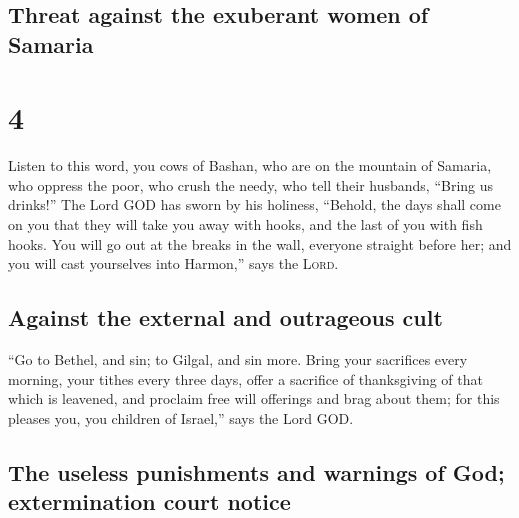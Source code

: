 \hypertarget{threat-against-the-exuberant-women-of-samaria}{%
\subsection{Threat against the exuberant women of
Samaria}\label{threat-against-the-exuberant-women-of-samaria}}

\hypertarget{section-3}{%
\section{4}\label{section-3}}

 Listen to this word, you cows of Bashan, who are on the
mountain of Samaria, who oppress the poor, who crush the needy, who tell
their husbands, ``Bring us drinks!''  The Lord GOD has
sworn by his holiness, ``Behold, the days shall come on you that they
will take you away with hooks, and the last of you with fish hooks.
 You will go out at the breaks in the wall, everyone
straight before her; and you will cast yourselves into Harmon,'' says
the \textsc{Lord}.

\hypertarget{against-the-external-and-outrageous-cult}{%
\subsection{Against the external and outrageous
cult}\label{against-the-external-and-outrageous-cult}}

 ``Go to Bethel, and sin; to Gilgal, and sin more. Bring
your sacrifices every morning, your tithes every three days,
 offer a sacrifice of thanksgiving of that which is
leavened, and proclaim free will offerings and brag about them; for this
pleases you, you children of Israel,'' says the Lord GOD.

\hypertarget{the-useless-punishments-and-warnings-of-god-extermination-court-notice}{%
\subsection{The useless punishments and warnings of God; extermination
court
notice}\label{the-useless-punishments-and-warnings-of-god-extermination-court-notice}}

